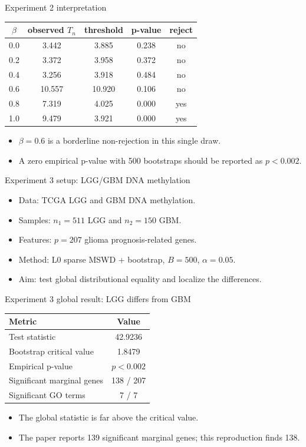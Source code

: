 \documentclass[aspectratio=169,11pt]{beamer}
\begin{document}
\begin{frame}{Experiment 2 interpretation}
\small
\begin{tabular}{ccccc}
\toprule
\(\beta\) & observed \(T_n\) & threshold & p-value & reject \\
\midrule
0.0 & 3.442 & 3.885 & 0.238 & no \\
0.2 & 3.372 & 3.958 & 0.372 & no \\
0.4 & 3.256 & 3.918 & 0.484 & no \\
0.6 & 10.557 & 10.920 & 0.106 & no \\
0.8 & 7.319 & 4.025 & 0.000 & yes \\
1.0 & 9.479 & 3.921 & 0.000 & yes \\
\bottomrule
\end{tabular}

\vspace{0.25cm}
\begin{itemize}
  \item \(\beta=0.6\) is a borderline non-rejection in this single draw.
  \item A zero empirical p-value with 500 bootstraps should be reported as \(p<0.002\).
\end{itemize}
\end{frame}

\begin{frame}{Experiment 3 setup: LGG/GBM DNA methylation}
\begin{itemize}
  \item Data: TCGA LGG and GBM DNA methylation.
  \item Samples: \(n_1=511\) LGG and \(n_2=150\) GBM.
  \item Features: \(p=207\) glioma prognosis-related genes.
  \item Method: L0 sparse MSWD + bootstrap, \(B=500\), \(\alpha=0.05\).
  \item Aim: test global distributional equality and localize the differences.
\end{itemize}
\end{frame}

\begin{frame}{Experiment 3 global result: LGG differs from GBM}
\begin{tabular}{lc}
\toprule
Metric & Value \\
\midrule
Test statistic & 42.9236 \\
Bootstrap critical value & 1.8479 \\
Empirical p-value & \(p<0.002\) \\
Significant marginal genes & 138 / 207 \\
Significant GO terms & 7 / 7 \\
\bottomrule
\end{tabular}

\vspace{0.5cm}
\begin{itemize}
  \item The global statistic is far above the critical value.
  \item The paper reports 139 significant marginal genes; this reproduction finds 138.
\end{itemize}
\end{frame}
\end{document}

